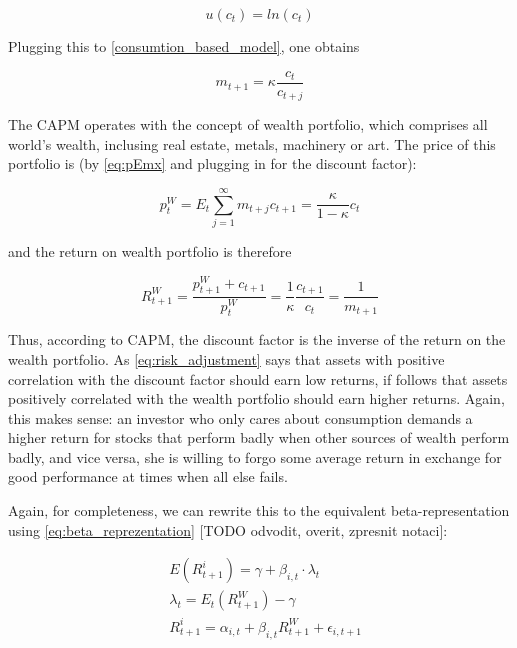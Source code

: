 	 		\begin{equation}
	 			u(c_t) = ln(c_t)
	 		\end{equation}
	 		
	 		Plugging this to \ref{consumtion_based_model}, one obtains 
	 		
	 		\begin{equation}
	 			m_{t+1} = \kappa \frac{c_t}{c_{t+j}}
	 		\end{equation}
	 		
	 		The CAPM operates with the concept of wealth portfolio, which comprises all world's wealth, inclusing real estate, metals, machinery or art. The price of this portfolio is (by \ref{eq:pEmx} and plugging in for the discount factor):  
	 		
	 		\begin{equation}
	 		p_t^W  = E_t \sum_{j=1}^{\infty} m_{t+j}c_{t+1} = \frac{\kappa}{1-\kappa}c_t
	 		\end{equation}
	 		
	 		and the return on wealth portfolio is therefore 
	 		
	 		\begin{equation}
	 		R_{t+1}^W  = \frac{p_{t+1}^W + c_{t+1}}{p_t^W} = \frac{1}{\kappa} \frac{c_{t+1}}{c_t} = \frac{1}{m_{t+1}}
	 		\end{equation}
	 		
	 		Thus, according to CAPM, the discount factor is the inverse of the return on the wealth portfolio. As \ref{eq:risk_adjustment} says that assets with positive correlation with the discount factor should earn low returns, if follows that assets positively correlated with the wealth portfolio should earn higher returns. Again, this makes sense: an investor who only cares about consumption demands a higher return for stocks that perform badly when other sources of wealth perform badly, and vice versa, she is willing to forgo some average return in exchange for good performance at times when all else fails. 
	 		
	 		Again, for completeness, we can rewrite this to the equivalent beta-representation using \ref{eq:beta_reprezentation} [TODO odvodit, overit, zpresnit notaci]: 
	 		
	 		\begin{align}
	 			& E(R_{t+1}^i) = \gamma + \beta_{i,t} \cdot \lambda_{t} \\
	 			& \lambda_{t} = E_t(R^W_{t+1}) - \gamma \\
	 			& R_{t+1}^i = \alpha_{i,t} + \beta_{i,t} R^W_{t+1} + \epsilon_{i,t+1}
	 		\end{align}  
	 		
